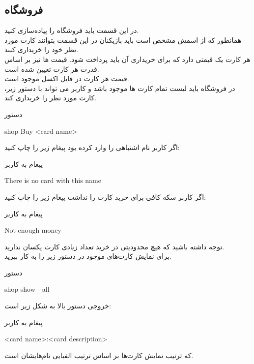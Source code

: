 \documentclass[]{article}
\begin{document}
\subsection*{{\titr فروشگاه}}
در این قسمت باید فروشگاه را پیاده‌سازی کنید.
\\
همانطور که از اسمش مشخص است باید بازیکنان در این قسمت بتوانند کارت مورد نظر 
خود را خریداری کنند.
\\
هر کارت یک قیمتی دارد که برای خریداری آن باید پرداخت شود. قیمت ها نیز بر 
اساس قدرت هر کارت تعیین شده است.
\\
قیمت هر کارت در فایل اکسل موجود است.
\\
در فروشگاه باید لیست تمام کارت ها موجود باشد و کاربر می تواند با دستور زیر، 
کارت مورد نظر را خریداری کند.
\begin{mybox}[colback=yellow]{دستور}
	\begin{latin}	
		shop Buy <card name>
	\end{latin}
\end{mybox}
اگر کاربر  نام اشتباهی را وارد کرده بود پیغام زیر را چاپ کنید:
\begin{mybox}[colback=yellow]{پیغام به کاربر}
	\begin{latin}	
		There is no card with this name
	\end{latin}
\end{mybox}
اگر کاربر سکه کافی برای خرید کارت را نداشت پیغام زیر را چاپ کنید:
\begin{mybox}[colback=yellow]{پیغام به کاربر}
	\begin{latin}	
		Not enough money
	\end{latin}
\end{mybox}
توجه داشته باشید که هیچ محدودیتی در خرید تعداد زیادی کارت یکسان ندارید.
\\
برای نمایش کارت‌های موجود در  دستور زیر را به کار ببرید.
\begin{mybox}[colback=yellow]{دستور}
	\begin{latin}	
		shop show -{}-all
	\end{latin}
\end{mybox}
خروجی دستور بالا به شکل زیر است:
\begin{mybox}[colback=yellow]{پیغام به کاربر}
	\begin{latin}	
		<card name>:<card description>
	\end{latin}
\end{mybox}
که ترتیب نمایش کارت‌ها بر اساس ترتیب الفبایی نام‌هایشان است.
\end{document}
